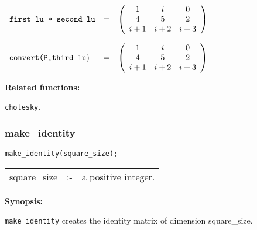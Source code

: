\vspace*{0.1in}

\begin{flushleft}  
\hspace*{0.1in}
\begin{math}  
\begin{array}{ccc}
${\tt first lu * second lu}$ & = & 
        \left( \begin{array}{ccc} 1 & i & 0 \\ 4 & 5 & 2 \\ i+1 & i+2 &
i+3 
 \end{array} \right) 
\end{array}
\end{math}  
\end{flushleft}

\begin{flushleft}  
\hspace*{0.1in}
\begin{math}  
\begin{array}{ccc}
${\tt convert({\cal P},third lu}$) \hspace*{0.1in} & = & \left( 
\begin{array}{c c c} 1 & i & 0 \\ 4 & 5 & 2 \\ i+1 & i+2 & i+3 
 \end{array} \right) 
\end{array}
\end{math}  
\end{flushleft}

{\bf Related functions:}

\hspace*{0.175in} {\tt cholesky}.


\subsubsection{make\_identity}
\label{linalg:make_identity}

\hspace*{0.175in} {\tt make\_identity(square\_size);}

\hspace*{0.1in} 
\begin{tabular}{l l l}
square\_size &:-& a positive integer.
\end{tabular}

{\bf Synopsis:} %

\hspace*{0.175in} {\tt make\_identity} creates the identity matrix of 
                dimension square\_size.

